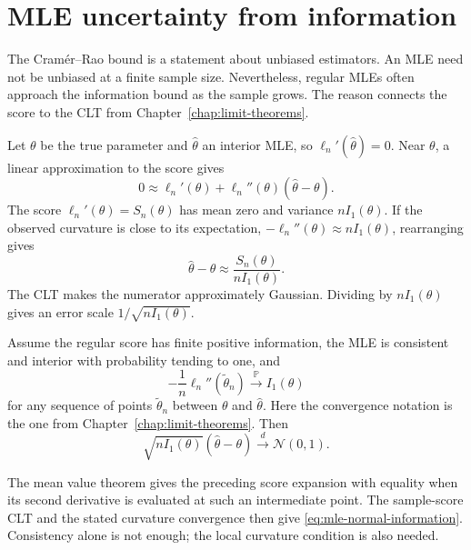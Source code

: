 \section{MLE uncertainty from information}
\label{sec:mle-information}

The Cramér--Rao bound is a statement about unbiased estimators.
An MLE need not be unbiased at a finite sample size. Nevertheless,
regular MLEs often approach the information bound as the sample grows.
The reason connects the score to the CLT from Chapter~\ref{chap:limit-theorems}.

Let \(\theta\) be the true parameter and \(\widehat\theta\) an interior
MLE, so \(\ell_n'(\widehat\theta)=0\).
Near \(\theta\), a linear approximation to the score gives
\[
  0\approx\ell_n'(\theta)
       +\ell_n''(\theta)(\widehat\theta-\theta).
\]
The score \(\ell_n'(\theta)=S_n(\theta)\) has mean zero and variance
\(nI_1(\theta)\). If the observed curvature is close to its expectation,
\(-\ell_n''(\theta)\approx nI_1(\theta)\), rearranging gives
\begin{equation}
  \widehat\theta-\theta
  \approx\frac{S_n(\theta)}{nI_1(\theta)}.
  \label{eq:mle-score-approximation}
\end{equation}
The CLT makes the numerator approximately Gaussian. Dividing by
\(nI_1(\theta)\) gives an error scale \(1/\sqrt{nI_1(\theta)}\).

\begin{result}
Assume the regular score has finite positive information, the MLE is
consistent and interior with probability tending to one, and
\[
  -\frac1n\ell_n''(\widetilde\theta_n)
       \xrightarrow{\mathbb P}I_1(\theta)
\]
for any sequence of points \(\widetilde\theta_n\) between \(\theta\) and
\(\widehat\theta\). Here the convergence notation is the one from
Chapter~\ref{chap:limit-theorems}. Then
\begin{equation}
  \sqrt{nI_1(\theta)}(\widehat\theta-\theta)
     \xrightarrow{d}\mathcal N(0,1).
  \label{eq:mle-normal-information}
\end{equation}
\end{result}

The mean value theorem gives the preceding score expansion with equality
when its second derivative is evaluated at such an intermediate point.
The sample-score CLT and the stated curvature convergence then give
\eqref{eq:mle-normal-information}. Consistency alone is not enough;
the local curvature condition is also needed.


